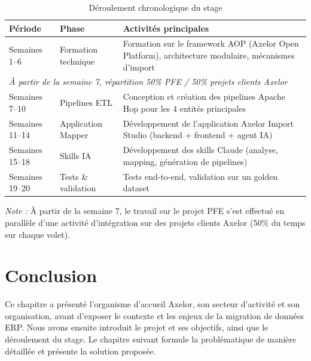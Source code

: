 \begin{table}[H]
  \centering
  \renewcommand{\arraystretch}{1.5}
  \begin{tabular}{p{3.5cm} p{3.5cm} p{7cm}}
    \toprule
    \rowcolor{gray!20}
    \textbf{Période} & \textbf{Phase} & \textbf{Activités principales} \\
    \midrule
    \rowcolor{gray!5}
    Semaines 1--6    & Formation technique   & Formation sur le framework AOP (Axelor Open Platform), architecture modulaire, mécanismes d'import \\
    \midrule
    \multicolumn{3}{l}{\textit{À partir de la semaine 7, répartition 50\% PFE / 50\% projets clients Axelor}} \\
    \midrule
    \rowcolor{gray!5}
    Semaines 7--10   & Pipelines ETL         & Conception et création des pipelines Apache Hop pour les 4 entités principales \\
    Semaines 11--14  & Application Mapper    & Développement de l'application Axelor Import Studio (backend + frontend + agent IA) \\
    \rowcolor{gray!5}
    Semaines 15--18  & Skills IA             & Développement des skills Claude (analyse, mapping, génération de pipelines) \\
    Semaines 19--20  & Tests \& validation   & Tests end-to-end, validation sur un golden dataset \\
    \bottomrule
  \end{tabular}
  \caption{Déroulement chronologique du stage}
  \label{tab:deroulement}
\end{table}

\textit{Note :} À partir de la semaine 7, le travail sur le projet PFE s'est effectué en parallèle d'une activité d'intégration sur des projets clients Axelor (50\% du temps sur chaque volet).

\section*{Conclusion}

Ce chapitre a présenté l'organisme d'accueil Axelor, son secteur d'activité et son organisation, avant d'exposer le contexte et les enjeux de la migration de données ERP. Nous avons ensuite introduit le projet et ses objectifs, ainsi que le déroulement du stage. Le chapitre suivant formule la problématique de manière détaillée et présente la solution proposée.
